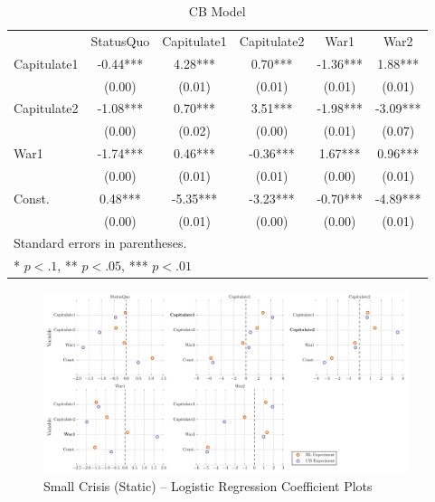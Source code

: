 \begin{table}
	\begin{subtable}{\textwidth}
		\begin{center}
		\caption{CB Model}
		\begin{tabular}{lccccc}
					&			&			  &				&		   &           \\
		\hline
		            & StatusQuo & Capitulate1 & Capitulate2 &   War1   &   War2     \\
		\hline
		Capitulate1 & -0.44***  & 4.28***     & 0.70***     & -1.36*** & 1.88***    \\
		            & (0.00)    & (0.01)      & (0.01)      & (0.01)   & (0.01)     \\
		Capitulate2 & -1.08***  & 0.70***     & 3.51***     & -1.98*** & -3.09***   \\
		            & (0.00)    & (0.02)      & (0.00)      & (0.01)   & (0.07)     \\
		War1        & -1.74***  & 0.46***     & -0.36***    & 1.67***  & 0.96***    \\
		            & (0.00)    & (0.01)      & (0.01)      & (0.00)   & (0.01)     \\
		Const.      & 0.48***   & -5.35***    & -3.23***    & -0.70*** & -4.89***   \\
		            & (0.00)    & (0.01)      & (0.00)      & (0.00)   & (0.01)     \\

		\hline
		\hline
		\multicolumn{6}{l}{Standard errors in parentheses.} \\
		\multicolumn{6}{l}{* $p<.1$, ** $p<.05$, *** $p<.01$} \\
		\end{tabular}
		\end{center}
	\end{subtable}
\tableSpace
\end{table}

\begin{figure}[h!]
	\includegraphics[width=0.95\textwidth]{WarReason/Figures/SC1_Coeffs}
    \caption{Small Crisis (Static) -- Logistic Regression Coefficient Plots}
    \label{fig:sc1_coeffs}
    \figSpace
\end{figure}

